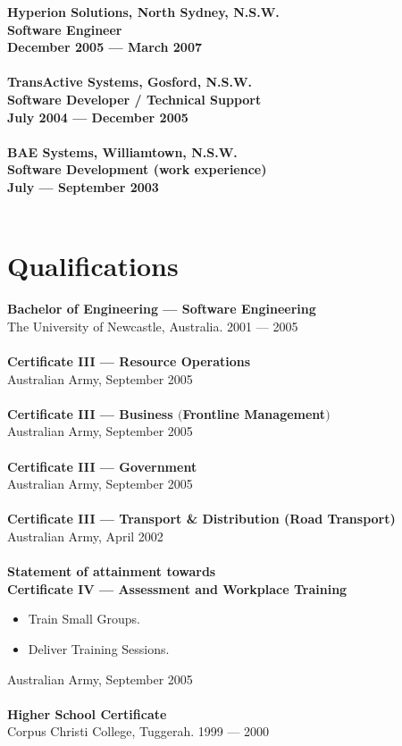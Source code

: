 \documentclass[a4paper]{article}
\begin{document}
\textbf{Hyperion Solutions, North Sydney, N.S.W.\\Software Engineer\\December 2005 --- March 2007} \\\\
\textbf{TransActive Systems, Gosford, N.S.W.\\Software Developer / Technical Support\\July 2004 --- December 2005}\\\\
\textbf{BAE Systems, Williamtown, N.S.W.\\Software Development (work experience)\\July --- September 2003}\\\\
\newpage
\ryanHeader
\section*{Qualifications}
\textbf{Bachelor of Engineering --- Software Engineering}\\
The University of Newcastle, Australia. 2001 --- 2005\\\\
\textbf{Certificate III --- Resource Operations}\\
Australian Army, September 2005\\\\
\textbf{Certificate III --- Business $($Frontline Management$)$}\\
Australian Army, September 2005\\\\
\textbf{Certificate III --- Government}\\
Australian Army, September 2005\\\\
\textbf{Certificate III --- Transport \& Distribution (Road Transport)}\\
Australian Army, April 2002\\\\
\textbf{Statement of attainment towards\\Certificate IV --- Assessment and Workplace Training}
\begin{itemize}
\item Train Small Groups.
\item Deliver Training Sessions.
\end{itemize}
Australian Army, September 2005\\\\
\textbf{Higher School Certificate}\\
Corpus Christi College, Tuggerah. 1999 --- 2000
\vspace{5pt}
\end{document}
